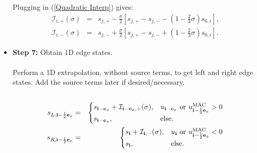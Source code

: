 \begin{itemize}
Plugging in (\ref{Quadratic Interp}) gives:
\begin{eqnarray}
\mathcal{I}_{i,+}(\sigma) &=& s_{j,+} - \frac{\sigma}{2}\left[s_{j,+}-s_{j,-}-\left(1-\frac{2}{3}\sigma\right)s_{6,i}\right], \\
\mathcal{I}_{i,-}(\sigma) &=& s_{j,-} + \frac{\sigma}{2}\left[s_{j,+}-s_{j,-}+\left(1-\frac{2}{3}\sigma\right)s_{6,i}\right].
\end{eqnarray}
\item {\bf Step 7:} Obtain 1D edge states.\\ \\
Perform a 1D extrapolation, without source terms, to get 
left and right edge states.  Add the source terms later if desired/necessary.\\ \\
\begin{eqnarray}
s_{L,{\bf i}-\frac{1}{2}{\bf e}_x} &=&
\begin{cases}
s_{{\bf i}-{\bf e}_x} + \mathcal{I}_{{\bf i}-{\bf e}_x,+}(\sigma), & u_{{\bf i}-{\bf e}_x} ~ \text{or} ~ u_{{\bf i}-\frac{1}{2}{\bf e}_x}^{\rm MAC} > 0 \\
s_{{\bf i}-{\bf e}_x}, & \text{else}.
\end{cases}\\
s_{R,{\bf i}-\frac{1}{2}{\bf e}_x} &=& 
\begin{cases}
s_{{\bf i}} + \mathcal{I}_{{\bf i},-}(\sigma), & u_{{\bf i}} ~ \text{or} ~ u_{{\bf i}-\frac{1}{2}{\bf e}_x}^{\rm MAC} < 0 \\
s_{{\bf i}}, & \text{else}.
\end{cases}
\end{eqnarray}
\end{itemize}
